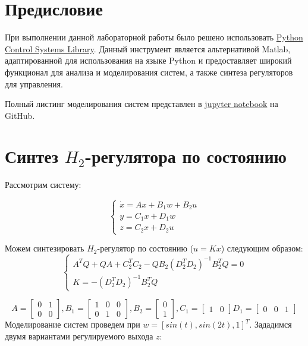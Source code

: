 \tableofcontents
\section*{Предисловие}
При выполнении данной лабораторной работы было решено использовать 
\href{https://python-control.readthedocs.io/en/0.9.4/}{Python Control Systems Library}.
Данный инструмент является альтернативой Matlab, адаптированной для использования на 
языке Python и предоставляет широкий функционал для анализа и моделирования систем,
а также синтеза регуляторов для управления.

Полный листинг моделирования систем представлен в \href{https://github.com/diuzhevVlad/control-theory-itmo-fall-2023/blob/main/Lab11/Lab11.ipynb}{jupyter notebook} на GitHub.

\pagebreak

\section{Синтез $H_2$-регулятора по состоянию}
Рассмотрим систему:

\begin{equation}
    \begin{cases}
        \dot{x} = Ax + B_1w + B_2u \\
        y = C_1x + D_1w\\
        z = C_2x + D_2u
    \end{cases}
\end{equation}

Можем синтезировать $H_2$-регулятор по состоянию ($u=Kx$) следующим образом:
\begin{equation}
    \begin{cases}
        A^TQ + QA + C_2^TC_2 - QB_2(D_2^TD_2)^{-1}B_2^TQ=0 \\
        K = -(D_2^TD_2)^{-1}B_2^TQ
    \end{cases}
\end{equation}

\begin{equation*}
    A = \begin{bmatrix}
        0 & 1 \\
        0 & 0
    \end{bmatrix},
    B_1 = \begin{bmatrix}
        1 & 0 & 0 \\
        0 & 1 & 0
    \end{bmatrix},
    B_2 = \begin{bmatrix}
        0 \\ 1
    \end{bmatrix},
    C_1 = \begin{bmatrix}
        1 & 0
    \end{bmatrix}
    D_1 = \begin{bmatrix}
        0 & 0 & 1
    \end{bmatrix}
\end{equation*}
Моделирование систем проведем при $w = [sin(t), sin(2t), 1]^T$.
Зададимся двумя вариантами регулируемого выхода $z$:
